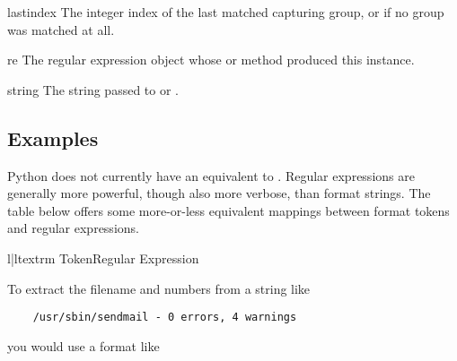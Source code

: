 \begin{memberdesc}[MatchObject]{lastindex}
The integer index of the last matched capturing group, or 
if no group was matched at all.
\end{memberdesc}

\begin{memberdesc}[MatchObject]{re}
The regular expression object whose  or
 method produced this  instance.
\end{memberdesc}

\begin{memberdesc}[MatchObject]{string}
The string passed to  or .
\end{memberdesc}

\subsection{Examples}


Python does not currently have an equivalent to .
Regular expressions are generally more powerful, though also more
verbose, than  format strings.  The table below
offers some more-or-less equivalent mappings between
 format tokens and regular expressions.

\begin{tableii}{l|l}{textrm}{ Token}{Regular Expression}
         {}
         {}
         {}
         {}
         {}
         {}
         {}
         {}
         {}
\end{tableii}

To extract the filename and numbers from a string like

\begin{verbatim}
    /usr/sbin/sendmail - 0 errors, 4 warnings
\end{verbatim}

you would use a  format like

